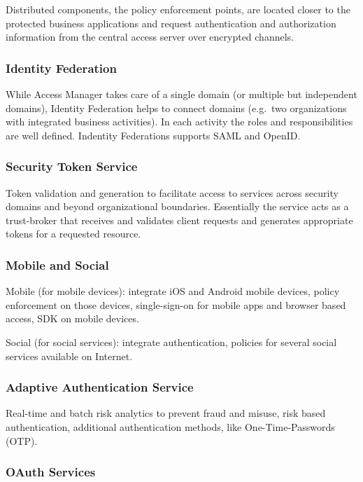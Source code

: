 Distributed components, the policy enforcement points, are located
closer to the protected business applications and request authentication
and authorization information from the central access server over
encrypted channels.


\subsubsection{Identity Federation}

While Access Manager takes care of a single domain (or multiple but
independent domains), Identity Federation helps to connect domains
(e.g.\ two organizations with integrated business activities).  In each
activity the roles and responsibilities are well defined. Indentity
Federations supports SAML and OpenID\@.

\subsubsection{Security Token Service}

Token validation and generation to facilitate access to services across
security domains and beyond organizational boundaries. Essentially the
service acts as a trust-broker that receives and validates client
requests and generates appropriate tokens for a requested resource.

\subsubsection{Mobile and Social}

Mobile (for mobile devices): integrate iOS and Android mobile devices,
policy enforcement on those devices, single-sign-on for mobile apps and
browser based access, SDK on mobile devices.

Social (for social services): integrate authentication, policies for
several social services available on Internet.


\subsubsection{Adaptive Authentication Service}

Real-time and batch risk analytics to prevent fraud and misuse, risk
based authentication, additional authentication methods, like
One-Time-Passwords (OTP).


\subsubsection{OAuth Services}

